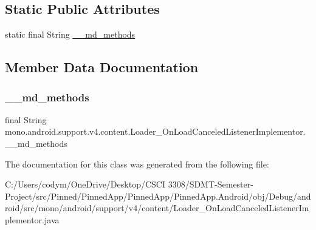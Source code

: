 \subsection*{Static Public Attributes}
\begin{DoxyCompactItemize}
\item 
static final String \hyperlink{classmono_1_1android_1_1support_1_1v4_1_1content_1_1_loader___on_load_canceled_listener_implementor_a1fb91411ee004f227bd993fdfb4f4747}{\+\_\+\+\_\+md\+\_\+methods}
\end{DoxyCompactItemize}


\subsection{Member Data Documentation}
\mbox{\label{classmono_1_1android_1_1support_1_1v4_1_1content_1_1_loader___on_load_canceled_listener_implementor_a1fb91411ee004f227bd993fdfb4f4747}} 
\subsubsection{\texorpdfstring{\+\_\+\+\_\+md\+\_\+methods}{\_\_md\_methods}}
{\footnotesize\ttfamily final String mono.\+android.\+support.\+v4.\+content.\+Loader\+\_\+\+On\+Load\+Canceled\+Listener\+Implementor.\+\_\+\+\_\+md\+\_\+methods\hspace{0.3cm}{\ttfamily [static]}}



The documentation for this class was generated from the following file\+:\begin{DoxyCompactItemize}
\item 
C\+:/\+Users/codym/\+One\+Drive/\+Desktop/\+C\+S\+C\+I 3308/\+S\+D\+M\+T-\/\+Semester-\/\+Project/src/\+Pinned/\+Pinned\+App/\+Pinned\+App/\+Pinned\+App.\+Android/obj/\+Debug/android/src/mono/android/support/v4/content/Loader\+\_\+\+On\+Load\+Canceled\+Listener\+Implementor.\+java\end{DoxyCompactItemize}
